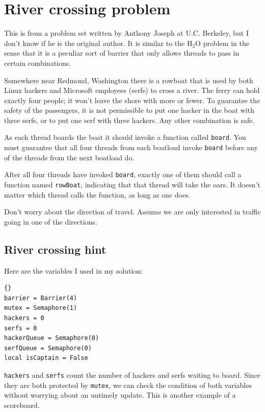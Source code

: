\documentclass{book}
\newcommand{\clearemptydoublepage}{\newpage\cleardoublepage}
\begin{document}
\section {River crossing problem}

This is from a problem set written by Anthony Joseph
at U.C. Berkeley, but I don't know if he is the original author.
It is similar to the H$_2$O problem in the sense that it is
a peculiar sort of barrier that only allows threads to pass
in certain combinations.

Somewhere near Redmond, Washington there is a rowboat that is used by
both Linux hackers and Microsoft employees (serfs) to cross a river.  The
ferry can hold exactly four people; it won't leave the shore with more
or fewer.  To guarantee the safety of the passengers, it is not
permissible to put one hacker in the boat with three serfs, or to
put one serf with three hackers.  Any other combination is safe.

As each thread boards the boat it should invoke a function
called {\tt board}.  You must guarantee that all four threads
from each boatload invoke {\tt board} before any of the threads
from the next boatload do.

After all four threads have invoked {\tt board}, exactly one of
them should call a function named {\tt rowBoat}, indicating
that that thread will take the oars.  It doesn't matter which thread
calls the function, as long as one does.

Don't worry about the direction of travel.  Assume we are
only interested in traffic going in one of the directions.


\clearemptydoublepage
\subsection {River crossing hint}

Here are the variables I used in my solution:

\begin{lstlisting}[caption={River crossing hint}]{}
barrier = Barrier(4)
mutex = Semaphore(1)
hackers = 0
serfs = 0
hackerQueue = Semaphore(0)
serfQueue = Semaphore(0)
local isCaptain = False
\end{lstlisting}

{\tt hackers} and {\tt serfs} count the number of hackers
and serfs waiting to board.  Since they are both protected by
{\tt mutex}, we can check the condition of both variables without
worrying about an untimely update.  This is another example
of a scoreboard.
\end{document}
